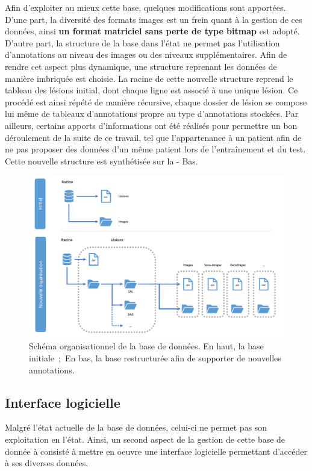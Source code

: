 Afin d'exploiter au mieux cette base, quelques modifications sont apportées. D'une part, la diversité des formats images est un frein quant à la gestion de ces données, ainsi \textbf{un format matriciel sans perte de type bitmap} est adopté. D'autre part, la structure de la base dans l'état ne permet pas l'utilisation d'annotations au niveau des images ou des niveaux supplémentaires. Afin de rendre cet aspect plus dynamique, une structure reprenant les données de manière imbriquée est choisie. La racine de cette nouvelle structure reprend le tableau des lésions initial, dont chaque ligne est associé à une unique lésion. Ce procédé est ainsi répété de manière récursive, chaque dossier de lésion se compose lui même de tableaux d'annotations propre au type d'annotations stockées. Par ailleurs, certains apports d'informations ont été réalisés pour permettre un bon déroulement de la suite de ce travail, tel que l'appartenance à un patient afin de ne pas proposer des données d'un même patient lors de l'entraînement et du test. Cette nouvelle structure est synthétisée sur la  - Bas.\par

\begin{figure}[H]
    \centering
    \includegraphics[width=0.9\linewidth]{contents/chapter_4/resources/scheme_data_structure.pdf}
    \caption{Schéma organisationnel de la base de données. En haut, la base initiale~;~En bas, la base restructurée afin de supporter de nouvelles annotations.}
    \label{fig:db_structure}
\end{figure}\par
\clearpage

\subsection{Interface logicielle}
\label{sec:dataset_api}
Malgré l'état actuelle de la base de données, celui-ci ne permet pas son exploitation en l'état. Ainsi, un second aspect de la gestion de cette base de donnée à consisté à mettre en oeuvre une interface logicielle permettant d'accéder à ses diverses données.\par

